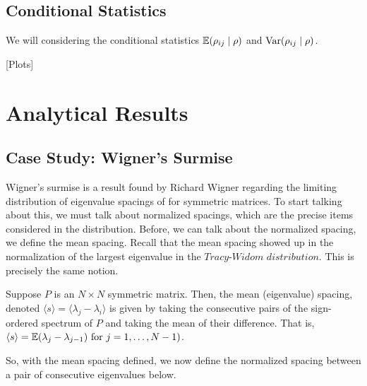 \subsection{Conditional Statistics}

We will considering the conditional statistics $\mathbb{E}({\rho}_{ij} \mid \rho)$ and $\text{Var}({\rho}_{ij} \mid \rho)$.

[Plots]


\section{Analytical Results}


\subsection{Case Study: Wigner's Surmise}

Wigner's surmise is a result found by Richard Wigner regarding the limiting distribution of eigenvalue spacings of for symmetric matrices. To start talking about this, we must talk about normalized spacings, which are the precise items considered in the distribution. Before, we can talk about the normalized spacing, we define the mean spacing. Recall that the mean spacing showed up in the normalization of the largest eigenvalue in the $\textit{Tracy-Widom distribution}$. This is precisely the same notion.

\begin{definition}
Suppose $P$ is an $N \times N$ symmetric matrix. Then, the mean (eigenvalue) spacing, denoted $\langle s \rangle = \langle \lambda_j - \lambda_i \rangle$ is given by taking the consecutive pairs of the sign-ordered spectrum of $P$ and taking the mean of their difference. That is, $\langle s \rangle = \mathbb{E}(\lambda_j - \lambda_{j-1}) \text{ for } j = 1,\dots,N-1)$.
\end{definition}

So, with the mean spacing defined, we now define the normalized spacing between a pair of consecutive eigenvalues below.

